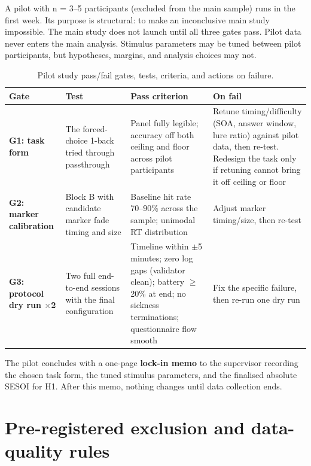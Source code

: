 A pilot with n = 3–5 participants (excluded from the main sample) runs in the first week. Its purpose
is structural: to make an inconclusive main study impossible. The main study does not launch until
all three gates pass. Pilot data never enters the main analysis. Stimulus parameters may be tuned
between pilot participants, but hypotheses, margins, and analysis choices may not.

\begin{longtable}{p{}|p{}|p{}|p{}}
\caption{Pilot study pass/fail gates, tests, criteria, and actions on failure.}\\
\hline
\textbf{Gate} & \textbf{Test} & \textbf{Pass criterion} & \textbf{On fail} \\
\hline
\endhead
\hline
\textbf{G1: task form} & The forced-choice 1-back tried through passthrough & Panel fully legible; accuracy off both ceiling and floor across pilot participants & Retune timing/difficulty (SOA, answer window, lure ratio) against pilot data, then re-test. Redesign the task only if retuning cannot bring it off ceiling or floor \\
\textbf{G2: marker calibration} & Block B with candidate marker fade timing and size & Baseline hit rate 70–90\% across the sample; unimodal RT distribution & Adjust marker timing/size, then re-test \\
\textbf{G3: protocol dry run $\times$2} & Two full end-to-end sessions with the final configuration & Timeline within $\pm$5 minutes; zero log gaps (validator clean); battery $\geq$ 20\% at end; no sickness terminations; questionnaire flow smooth & Fix the specific failure, then re-run one dry run \\
\hline
\end{longtable}

The pilot concludes with a one-page \textbf{lock-in memo} to the supervisor recording the chosen task
form, the tuned stimulus parameters, and the finalised absolute SESOI for H1. After this memo,
nothing changes until data collection ends.


\section{Pre-registered exclusion and data-quality rules}

